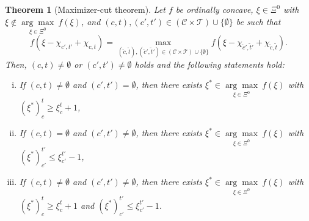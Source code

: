 \documentclass[12pt]{amsart}
\newtheorem{theorem}{Theorem}
\theoremstyle{remark}
\begin{document}
\begin{theorem}[Maximizer-cut theorem] \label{thm:maximizer-cut}
Let $f$ be ordinally concave, $\xi\in \Xi^0$ with $\xi \not\in \underset {\xi\in \Xi^0} {\arg\max} \: f(\xi)$, and $(c,t), (c',t') \in (\mathcal C \times \mathcal T) \cup \{\emptyset\}$ be such that
$$
f(\xi-\chi_{c',t'}+\chi_{c,t}) = \max_{(\tilde c,\tilde t), (\tilde c',\tilde t') \in (\mathcal C \times \mathcal T) \cup \{\emptyset\}} f(\xi-\chi_{\tilde c',\tilde t'}+\chi_{\tilde c,\tilde t}).
$$
Then, $(c,t) \neq \emptyset$ or $(c',t') \neq \emptyset$ holds and the following statements hold:
\begin{enumerate}[(i)]
\item If $(c,t) \neq \emptyset$ and $(c',t') = \emptyset$, then there exists $\xi^*\in \underset {\xi\in \Xi^0} {\arg\max} \: f(\xi)$ with $(\xi^*)^t_c \ge  \xi^t_c+1$,
\item If $(c,t) = \emptyset$ and $(c',t') \neq \emptyset$, then there exists $\xi^* \in \underset {\xi\in \Xi^0} {\arg\max} \: f(\xi)$ with $(\xi^*)^{t'}_{c'} \le \xi^{t'}_{c'}-1$,
\item If $(c,t) \neq \emptyset$ and $(c',t') \neq \emptyset$, then there exists $\xi^* \in \underset {\xi\in \Xi^0} {\arg\max} \: f(\xi)$ with $(\xi^*)^t_c \ge \xi^t_c+1$ and $(\xi^*)^{t'}_{c'} \le \xi^{t'}_{c'}-1$.
\end{enumerate}
\end{theorem}
\end{document}
